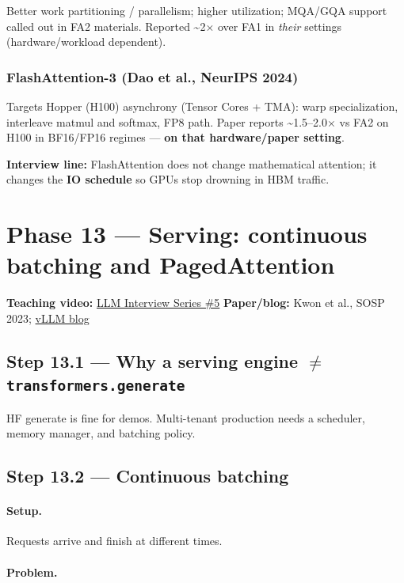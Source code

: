 \documentclass[11pt,a4paper]{article}
\begin{document}
Better work partitioning / parallelism; higher utilization; MQA/GQA support called out in FA2 materials. Reported \textasciitilde{}2$\times$ over FA1 in \textit{their} settings (hardware/workload dependent).


\subsubsection{FlashAttention-3 (Dao et al., NeurIPS 2024)}

Targets Hopper (H100) asynchrony (Tensor Cores + TMA): warp specialization, interleave matmul and softmax, FP8 path. Paper reports \textasciitilde{}1.5--2.0$\times$ vs FA2 on H100 in BF16/FP16 regimes --- \textbf{on that hardware/paper setting}.


\textbf{Interview line:} FlashAttention does not change mathematical attention; it changes the \textbf{IO schedule} so GPUs stop drowning in HBM traffic.


\bigskip


\clearpage
\section{Phase 13 --- Serving: continuous batching and PagedAttention}


\textbf{Teaching video:} \href{https://www.youtube.com/watch?v=-AB6m0Spo6c}{LLM Interview Series \#5}   \textbf{Paper/blog:} Kwon et al., SOSP 2023; \href{https://vllm.ai/blog/2023-06-20-vllm}{vLLM blog}


\subsection{Step 13.1 --- Why a serving engine $\neq$ \texttt{transformers.generate}}

HF generate is fine for demos. Multi-tenant production needs a scheduler, memory manager, and batching policy.


\subsection{Step 13.2 --- Continuous batching}


\paragraph{Setup.}

Requests arrive and finish at different times.


\paragraph{Problem.}
\end{document}
